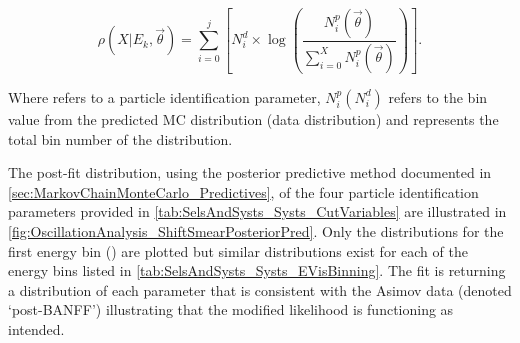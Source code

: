 \begin{equation}
\rho(X | E_k, \vec{\theta}) = \sum^{j}_{i = 0} \left[ N_i^d \times \log \left( \frac{N_i^p (\vec{\theta})}{\sum^{X}_{i = 0}N_i^p (\vec{\theta})} \right) \right].
\end{equation}

Where  refers to a particle identification parameter, $N_{i}^{p}(N_{i}^{d})$ refers to the  bin value from the predicted MC distribution (data distribution) and  represents the total bin number of the  distribution.

The post-fit distribution, using the posterior predictive method documented in \autoref{sec:MarkovChainMonteCarlo_Predictives}, of the four particle identification parameters provided in \autoref{tab:SelsAndSysts_Systs_CutVariables} are illustrated in \autoref{fig:OscillationAnalysis_ShiftSmearPosteriorPred}. Only the distributions for the first energy bin () are plotted but similar distributions exist for each of the energy bins listed in \autoref{tab:SelsAndSysts_Systs_EVisBinning}. The fit is returning a distribution of each parameter that is consistent with the Asimov data (denoted `post-BANFF') illustrating that the modified likelihood is functioning as intended. 

